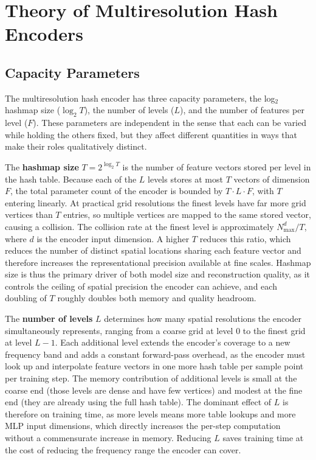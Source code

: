 \documentclass[12pt, a4paper, twoside]{report}
\begin{document}
\section{Theory of Multiresolution Hash Encoders}
\label{sec:enc_theory}

\subsection{Capacity Parameters}
\label{subsec:enc_params_theory}

The multiresolution hash encoder has three capacity parameters, the log$_2$ hashmap size ($\log_2 T$), the number of levels ($L$), and the number of features per level ($F$). These parameters are independent in the sense that each can be varied while holding the others fixed, but they affect different quantities in ways that make their roles qualitatively distinct.

The \textbf{hashmap size} $T = 2^{\log_2 T}$ is the number of feature vectors stored per level in the hash table. Because each of the $L$ levels stores at most $T$ vectors of dimension $F$, the total parameter count of the encoder is bounded by $T \cdot L \cdot F$, with $T$ entering linearly. At practical grid resolutions the finest levels have far more grid vertices than $T$ entries, so multiple vertices are mapped to the same stored vector, causing a collision. The collision rate at the finest level is approximately $N_\mathrm{max}^d / T$, where $d$ is the encoder input dimension. A higher $T$ reduces this ratio, which reduces the number of distinct spatial locations sharing each feature vector and therefore increases the representational precision available at fine scales. Hashmap size is thus the primary driver of both model size and reconstruction quality, as it controls the ceiling of spatial precision the encoder can achieve, and each doubling of $T$ roughly doubles both memory and quality headroom.

The \textbf{number of levels} $L$ determines how many spatial resolutions the encoder simultaneously represents, ranging from a coarse grid at level 0 to the finest grid at level $L-1$. Each additional level extends the encoder's coverage to a new frequency band and adds a constant forward-pass overhead, as the encoder must look up and interpolate feature vectors in one more hash table per sample point per training step. The memory contribution of additional levels is small at the coarse end (those levels are dense and have few vertices) and modest at the fine end (they are already using the full hash table). The dominant effect of $L$ is therefore on training time, as more levels means more table lookups and more MLP input dimensions, which directly increases the per-step computation without a commensurate increase in memory. Reducing $L$ saves training time at the cost of reducing the frequency range the encoder can cover.
\end{document}
